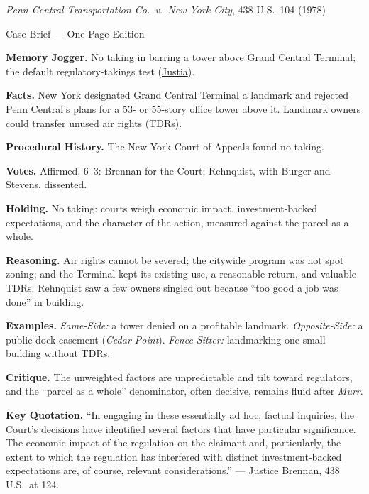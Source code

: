 \documentclass[12pt]{article}
\begin{document}
\begin{center}
{\Large \textit{Penn Central Transportation Co.\ v.\ New York City}, 438 U.S.\ 104 (1978)\par}
\vspace{0.3em}
{\normalsize Case Brief --- One-Page Edition\par}
\end{center}

\textbf{Memory Jogger.} No taking in barring a tower above Grand Central Terminal; the default regulatory-takings test (\href{https://supreme.justia.com/cases/federal/us/438/104/}{Justia}).

\textbf{Facts.} New York designated Grand Central Terminal a landmark and rejected Penn Central's plans for a 53- or 55-story office tower above it. Landmark owners could transfer unused air rights (TDRs).

\textbf{Procedural History.} The New York Court of Appeals found no taking.

\textbf{Votes.} Affirmed, 6--3: Brennan for the Court; Rehnquist, with Burger and Stevens, dissented.

\textbf{Holding.} No taking: courts weigh economic impact, investment-backed expectations, and the character of the action, measured against the parcel as a whole.

\textbf{Reasoning.} Air rights cannot be severed; the citywide program was not spot zoning; and the Terminal kept its existing use, a reasonable return, and valuable TDRs. Rehnquist saw a few owners singled out because ``too good a job was done'' in building.

\textbf{Examples.} \emph{Same-Side:} a tower denied on a profitable landmark. \emph{Opposite-Side:} a public dock easement (\textit{Cedar Point}). \emph{Fence-Sitter:} landmarking one small building without TDRs.

\textbf{Critique.} The unweighted factors are unpredictable and tilt toward regulators, and the ``parcel as a whole'' denominator, often decisive, remains fluid after \textit{Murr}.

\textbf{Key Quotation.} ``In engaging in these essentially ad hoc, factual inquiries, the Court's decisions have identified several factors that have particular significance. The economic impact of the regulation on the claimant and, particularly, the extent to which the regulation has interfered with distinct investment-backed expectations are, of course, relevant considerations.'' --- Justice Brennan, 438 U.S.\ at 124.
\end{document}
